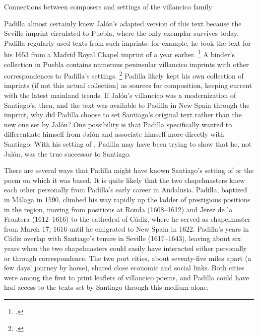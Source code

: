 \begin{table}
    \caption{Connections between composers and settings of the 
    villancico family}
  
    \label{tab:Voces-connections}
 
\end{table}

Padilla almost certainly knew Jalón's adapted version of this text because the
Seville imprint circulated to Puebla, where the only exemplar survives today.
Padilla regularly used texts from such imprints: for example, he took the text
for his 1653  from a Madrid Royal Chapel imprint
of a year earlier.%
    \footnote{.}
A binder's collection in Puebla contains numerous peninsular villancico imprints
with other correspondences to Padilla's settings.%
    \footnote{.}
Padilla likely kept his own collection of imprints (if not this actual
collection) as sources for composition, keeping current with the latest mainland
trends.
If Jalón's villancico was a modernization of Santiago's, then, and the text was
available to Padilla in New Spain through the imprint, why did Padilla choose to
set Santiago's original text rather than the new one set by Jalón?
One possibility is that Padilla specifically wanted to differentiate himself
from Jalón and associate himself more directly with Santiago.
With his setting of , Padilla may have been
trying to show that he, not Jalón, was the true successor to Santiago.

There are several ways that Padilla might have known Santiago's setting of
 or the poem on which it was based.
It is quite likely that the two chapelmasters knew each other personally from
Padilla's early career in Andalusia.
Padilla, baptized in Málaga in 1590, climbed his way rapidly up the ladder of
prestigious positions in the region, moving from positions at Ronda (1608--1612)
and Jerez de la Frontera (1612--1616) to the cathedral of Cádiz, where he served
as chapelmaster from March 17, 1616 until he emigrated to New Spain in 1622.%
    \Autocite{Gembero:Padilla}
Padilla's years in Cádiz overlap with Santiago's tenure in Seville (1617--1643),
leaving about six years when the two chapelmasters could easily have interacted
either personally or through correspondence.
The two port cities, about seventy-five miles apart (a few days' journey by
horse), shared close economic and social links.
Both cities were among the first to print leaflets of villancico poems, and
Padilla could have had access to the texts set by Santiago through this medium
alone.%
    \Autocite
    [ and \emph{Sevilla}]
    {BNE:VCs17C}

